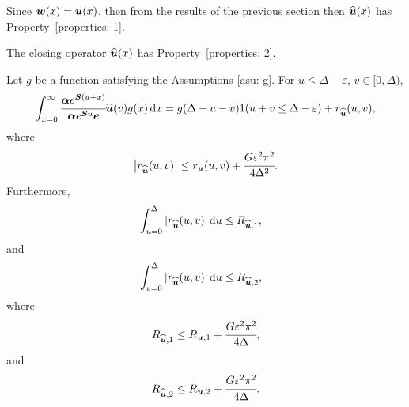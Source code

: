 Since \(\boldsymbol w(x)=\boldsymbol u(x)\), then from the results of the previous section then \(\widehat{\boldsymbol u}(x)\) has Property~\ref{properties: 1}.

\begin{cor}\label{cor: cond bnd 2 U2}
	The closing operator \(\widehat{\boldsymbol u}(x)\) has Property~\ref{properties: 2}.

	Let \(g\) be a function satisfying the Assumptions \ref{asu: g}. For \(u\leq \Delta-\varepsilon \), \(v\in[ 0,\Delta)\), 
	\[\int_{x=0}^\infty \cfrac{\boldsymbol \alpha  e^{\boldsymbol{S} (u+x)} }{\boldsymbol \alpha  e^{\boldsymbol{S} u} \boldsymbol e} \widehat{\boldsymbol u}(v)g(x)\, \mathrm{d} x = g(\Delta-u-v) 1(u+v\leq\Delta-\varepsilon) + r_{\widehat{\boldsymbol u}} (u,v),\]
	where 
	\[\left|r_{\widehat{\boldsymbol u}} (u,v)\right|\leq r_{\boldsymbol u} (u,v) + \cfrac{G \varepsilon^2 \pi^2}{4\Delta^2}.\]
	Furthermore,  
	\begin{align*}
		&\int_{u=0}^{\Delta}| r_{\widehat{\boldsymbol u}}(u,v)|\, \mathrm{d} u
		\leq R_{{\widehat{\boldsymbol u}},1},
	\end{align*}
	and
	\begin{align*}
		&\int_{v=0}^{\Delta}| r_{\widehat{\boldsymbol u}}(u,v)|\, \mathrm{d} u
		\leq R_{{\widehat{\boldsymbol u}},2},
	\end{align*}
	where 
	\[R_{{\widehat{\boldsymbol u}},1} \leq R_{{{\boldsymbol u}},1} + \cfrac{G \varepsilon^2 \pi^2}{4\Delta},\]
	and
	\[R_{{\widehat{\boldsymbol u}},2} \leq R_{{{\boldsymbol u}},2} + \cfrac{G \varepsilon^2 \pi^2}{4\Delta}.\]
\end{cor}
